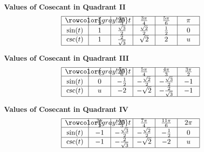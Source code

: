 \documentclass[nooutcomes, noauthor]{ximera}
\begin{document}
\begin{center}
\textbf{Values of Cosecant in Quadrant II}
\renewcommand*{\arraystretch}{2.5}
\setlength{\arrayrulewidth}{0.5mm}
\setlength{\tabcolsep}{18pt}
\[
\begin{array}{|>{\centering\arraybackslash$} p{1cm} <{$} | >{\centering\arraybackslash$} p{.75cm} <{$} |  >{\centering\arraybackslash$} p{.75cm} <{$} |  >{\centering\arraybackslash$} p{.75cm} <{$} |  >{\centering\arraybackslash$} p{.75cm} <{$} |  >{\centering\arraybackslash$} p{.75cm} <{$} |}
\hline 
\rowcolor{gray!20}
t & \frac{\pi}{2} & \frac{2\pi}{3} & \frac{3\pi}{4} & \frac{5\pi}{6} & \pi\\
\hline
\sin(t) & 1 & \frac{\sqrt{3}}{2} & \frac{\sqrt{2}}{2} & \frac{1}{2} & 0\\
\hline
\csc(t) & 1 & \frac{2}{\sqrt{3}}& \sqrt{2} & 2 & u\\
\hline 
\end{array}
\]
\end{center}

\begin{center}
\textbf{Values of Cosecant in Quadrant III}
\renewcommand*{\arraystretch}{2.5}
\setlength{\arrayrulewidth}{0.5mm}
\setlength{\tabcolsep}{18pt}
\[
\begin{array}{|>{\centering\arraybackslash$} p{1cm} <{$} | >{\centering\arraybackslash$} p{.75cm} <{$} |  >{\centering\arraybackslash$} p{.75cm} <{$} |  >{\centering\arraybackslash$} p{.75cm} <{$} |  >{\centering\arraybackslash$} p{.75cm} <{$} |  >{\centering\arraybackslash$} p{.75cm} <{$} |}
\hline 
\rowcolor{gray!20}
t & \pi & \frac{7\pi}{6} & \frac{5\pi}{4} & \frac{4\pi}{3} & \frac{3\pi}{2}\\
\hline
\sin(t) & 0 & -\frac{1}{2} &-\frac{\sqrt{2}}{2} & -\frac{\sqrt{3}}{2} & -1\\
\hline
\csc(t) & u & -2& -\sqrt{2} & -\frac{2}{\sqrt{3}}& -1\\
\hline 
\end{array}
\]
\end{center}

\begin{center}
\textbf{Values of Cosecant in Quadrant IV}
\renewcommand*{\arraystretch}{2.5}
\setlength{\arrayrulewidth}{0.5mm}
\setlength{\tabcolsep}{18pt}
\[
\begin{array}{|>{\centering\arraybackslash$} p{1cm} <{$} | >{\centering\arraybackslash$} p{.75cm} <{$} |  >{\centering\arraybackslash$} p{.75cm} <{$} |  >{\centering\arraybackslash$} p{.75cm} <{$} |  >{\centering\arraybackslash$} p{.75cm} <{$} |  >{\centering\arraybackslash$} p{.75cm} <{$} |}
\hline 
\rowcolor{gray!20}
t & \frac{3\pi}{2} & \frac{5\pi}{3} & \frac{7\pi}{4} & \frac{11\pi}{6} & 2\pi\\
\hline
\sin(t) & -1 & -\frac{\sqrt{3}}{2} & -\frac{\sqrt{2}}{2} & -\frac{1}{2} & 0\\
\hline
\csc(t) & -1 & -\frac{2}{\sqrt{3}}& -\sqrt{2} & -2 & u\\
\hline 
\end{array}
\]
\end{center}
\end{document}
